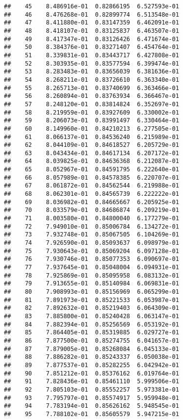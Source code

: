 \documentclass[]{article}
\begin{document}
\begin{verbatim}
##    45    8.486916e-01  0.82866195  6.527593e-01
##    46    8.476268e-01  0.82899774  6.513548e-01
##    47    8.411880e-01  0.83147359  6.462091e-01
##    48    8.418107e-01  0.83125837  6.463507e-01
##    49    8.417347e-01  0.83126426  6.471674e-01
##    50    8.384376e-01  0.83271407  6.454764e-01
##    51    8.339831e-01  0.83443717  6.427808e-01
##    52    8.303935e-01  0.83577594  6.399474e-01
##    53    8.283483e-01  0.83656039  6.381636e-01
##    54    8.268211e-01  0.83726610  6.363340e-01
##    55    8.265713e-01  0.83740699  6.363466e-01
##    56    8.260894e-01  0.83763934  6.366467e-01
##    57    8.248120e-01  0.83814824  6.352697e-01
##    58    8.219959e-01  0.83927609  6.330002e-01
##    59    8.206073e-01  0.83991497  6.330464e-01
##    60    8.149960e-01  0.84210213  6.277505e-01
##    61    8.066137e-01  0.84536240  6.215989e-01
##    62    8.044109e-01  0.84618527  6.205729e-01
##    63    8.043434e-01  0.84617134  6.207172e-01
##    64    8.039825e-01  0.84636368  6.212087e-01
##    65    8.052967e-01  0.84591795  6.222640e-01
##    66    8.057989e-01  0.84578385  6.220707e-01
##    67    8.061872e-01  0.84562544  6.219988e-01
##    68    8.062301e-01  0.84565739  6.222222e-01
##    69    8.036982e-01  0.84665667  6.205925e-01
##    70    8.033579e-01  0.84686874  6.209219e-01
##    71    8.003580e-01  0.84800040  6.177279e-01
##    72    7.949010e-01  0.85006784  6.134272e-01
##    73    7.932748e-01  0.85067505  6.104269e-01
##    74    7.926590e-01  0.85093637  6.098979e-01
##    75    7.930643e-01  0.85069204  6.097128e-01
##    76    7.930746e-01  0.85077353  6.090697e-01
##    77    7.937645e-01  0.85048004  6.094931e-01
##    78    7.925869e-01  0.85095958  6.083132e-01
##    79    7.913655e-01  0.85140984  6.069831e-01
##    80    7.908993e-01  0.85156969  6.065299e-01
##    81    7.891973e-01  0.85221533  6.053987e-01
##    82    7.892632e-01  0.85219403  6.064309e-01
##    83    7.885800e-01  0.85240428  6.063147e-01
##    84    7.882394e-01  0.85256569  6.053192e-01
##    85    7.864405e-01  0.85319885  6.029727e-01
##    86    7.877500e-01  0.85274755  6.041657e-01
##    87    7.879005e-01  0.85268084  6.045133e-01
##    88    7.886282e-01  0.85243337  6.050038e-01
##    89    7.877537e-01  0.85282255  6.042942e-01
##    90    7.851212e-01  0.85376162  6.019764e-01
##    91    7.828436e-01  0.85461110  5.999506e-01
##    92    7.805103e-01  0.85552257  5.973381e-01
##    93    7.795797e-01  0.85574917  5.959948e-01
##    94    7.783194e-01  0.85626162  5.948545e-01
##    95    7.788102e-01  0.85605579  5.947215e-01

\end{verbatim}
\end{document}
